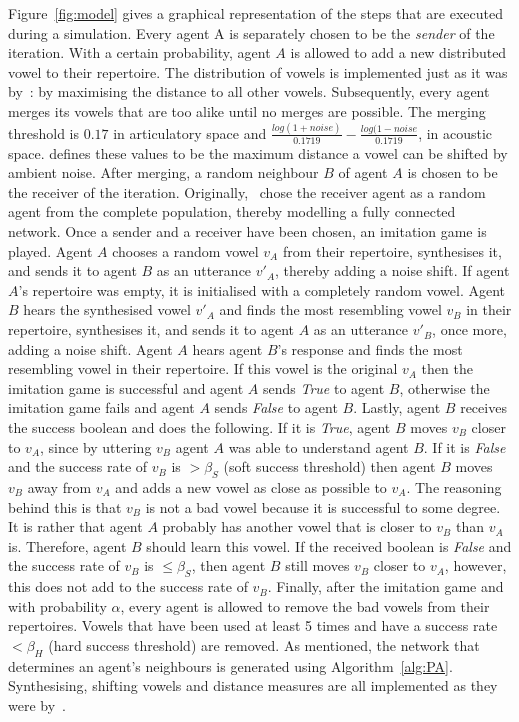 \documentclass[11pt]{article}
\begin{document}
Figure~\ref{fig:model} gives a graphical representation of the steps that are executed during a simulation. Every agent A is separately chosen
to be the \textit{sender} of the iteration. With a certain probability, agent $A$ is allowed to add a new distributed vowel to their repertoire.
The distribution of vowels is implemented just as it was by~: by
maximising the distance to all other vowels. Subsequently, every agent merges its vowels that are too alike until no merges
are possible. The merging threshold is $0.17$ in articulatory space and $\frac{log(1+noise)}{0.1719} - \frac{log(1-noise}{0.1719}$, in acoustic space.
 defines these values to be the maximum distance a vowel can be shifted by ambient noise.
After merging, a random neighbour $B$ of agent $A$ is chosen to be the receiver of the iteration.
Originally,~ chose the receiver agent as a random agent from the
complete population, thereby modelling a fully connected network. Once a sender and a receiver have been chosen, an
imitation game is played. Agent $A$ chooses a random vowel $v_A$ from their repertoire, synthesises it, and sends it to
agent $B$ as an utterance $v'_A$, thereby adding a noise shift. If agent $A$'s repertoire was empty, it is
initialised with a completely random vowel. Agent $B$ hears the synthesised vowel $v'_A$ and finds the most resembling
vowel $v_B$ in their repertoire, synthesises it, and sends it to agent $A$ as an utterance $v'_B$, once more, adding a
noise shift. Agent $A$ hears agent $B$'s response and finds the most resembling vowel in their repertoire. If
this vowel is the original $v_A$ then the imitation game is successful and agent $A$ sends \textit{True} to agent $B$,
otherwise the imitation game fails and agent $A$ sends \textit{False} to agent $B$. Lastly, agent $B$ receives the
success boolean and does the following. If it is \textit{True}, agent $B$ moves $v_B$ closer to $v_A$, since by
uttering $v_B$ agent $A$ was able to understand agent $B$. If it is \textit{False} and the success rate of $v_B$ is $>\beta_S$ (soft success threshold)
then agent $B$ moves $v_B$ away from $v_A$ and adds a new vowel as close as possible to $v_A$. The reasoning
behind this is that $v_B$ is not a bad vowel because it is successful to some degree. It is rather that
agent $A$ probably has another vowel that is closer to $v_B$ than $v_A$ is. Therefore, agent $B$ should learn this
vowel. If the received boolean is \textit{False} and the success rate of $v_B$ is $\leq \beta_S$, then agent $B$ still
moves $v_B$ closer to $v_A$, however, this does not add to the success rate of $v_B$. Finally, after the imitation game
and with probability $\alpha$, every agent is allowed to remove the bad vowels from their repertoires.
Vowels that have been used at least 5 times and have a success rate $< \beta_H$ (hard success threshold) are removed. As mentioned, the network
that determines an agent's neighbours is generated using Algorithm~\ref{alg:PA}. Synthesising, shifting vowels and
distance measures are all implemented as they were by~.
\end{document}

